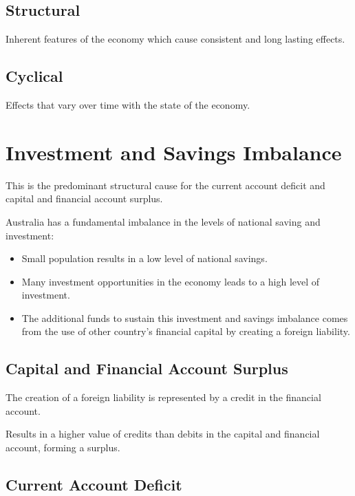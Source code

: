 \documentclass[a4paper,11pt]{article}
\begin{document}
\subsection{Structural}

Inherent features of the economy which cause consistent and long lasting
effects.


\subsection{Cyclical}

Effects that vary over time with the state of the economy.




\section{Investment and Savings Imbalance}

This is the predominant structural cause for the current account deficit and
capital and financial account surplus.

Australia has a fundamental imbalance in the levels of national saving and
investment:

\begin{itemize}
\item Small population results in a low level of national savings.
\item Many investment opportunities in the economy leads to a high level of
	investment.
\item The additional funds to sustain this investment and savings imbalance
	comes from the use of other country's financial capital by creating a
	foreign liability.
\end{itemize}


\subsection{Capital and Financial Account Surplus}

The creation of a foreign liability is represented by a credit in the financial
account.

Results in a higher value of credits than debits in the capital and financial
account, forming a surplus.


\subsection{Current Account Deficit}
\end{document}
